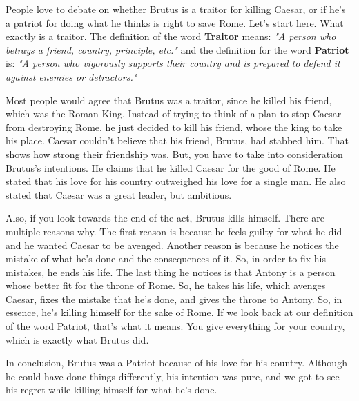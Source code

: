 People love to debate on whether Brutus is a traitor for killing Caesar, or if
he’s a patriot for doing what he thinks is right to save Rome. Let’s start here.
What exactly is a traitor. The definition of the word \textbf{Traitor} means:
\textit{"A person who betrays a friend, country, principle, etc."} and the
definition for the word \textbf{Patriot} is: \textit{"A person who vigorously
supports their country and is prepared to defend it against enemies or
detractors."}

Most people would agree that Brutus was a traitor, since he killed his friend,
which was the Roman King. Instead of trying to think of a plan to stop Caesar
from destroying Rome, he just decided to kill his friend, whose the king to take
his place. Caesar couldn’t believe that his friend, Brutus, had stabbed him.
That shows how strong their friendship was. But, you have to take into
consideration Brutus’s intentions. He claims that he killed Caesar for the good
of Rome. He stated that his love for his country outweighed his love for a
single man. He also stated that Caesar was a great leader, but ambitious.

Also, if you look towards the end of the act, Brutus kills himself. There are
multiple reasons why. The first reason is because he feels guilty for what he
did and he wanted Caesar to be avenged. Another reason is because he notices the
mistake of what he’s done and the consequences of it. So, in order to fix his
mistakes, he ends his life. The last thing he notices is that Antony is a person
whose better fit for the throne of Rome. So, he takes his life, which avenges
Caesar, fixes the mistake that he’s done, and gives the throne to Antony. So, in
essence, he’s killing himself for the sake of Rome. If we look back at our
definition of the word Patriot, that’s what it means. You give everything for
your country, which is exactly what Brutus did.

In conclusion, Brutus was a Patriot because of his love for his country.
Although he could have done things differently, his intention was pure, and we
got to see his regret while killing himself for what he’s done.

